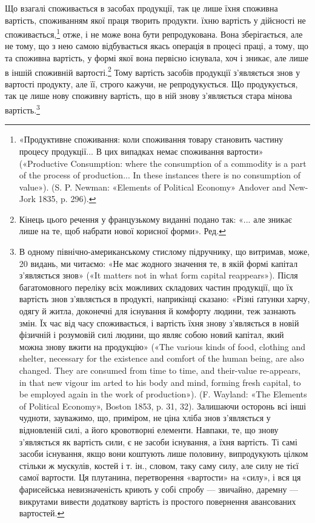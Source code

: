 Що взагалі споживається в засобах продукції, так це лише
їхня споживна вартість, споживанням якої праця творить продукти.
їхню вартість у дійсності не споживається,\footnote{
«Продуктивне споживання: коли споживання товару становить
частину процесу продукції... В цих випадках немає споживання вартости»
(«Productive Consumption: where the consumption of a commodity is a
part of the process of production... In these instances there is no consumption
of value»). (S. P. Newman: «Elements of Political Economy» Andover
and New-Jork 1835, p. 296).
} отже, і
не може вона бути репродукована. Вона зберігається, але не
тому, що з нею самою відбувається якась операція в процесі
праці, а тому, що та споживна вартість, у формі якої вона первісно
існувала, хоч і зникає, але лише в іншій споживній вартості.\footnote*{
Кінець цього речення у французькому виданні подано так: «... але
зникає лише на те, щоб набрати нової корисної форми». Ред.
}
Тому вартість засобів продукції з’являється знов у вартості
продукту, але її, строго кажучи, не репродукується. Що продукується,
так це лише нову споживну вартість, що в ній знову
з’являється стара мінова вартість.\footnote{
В одному північно-американському стислому підручнику, що витримав,
може, 20 видань, ми читаємо: «Не має жодного значення те, в
якій формі капітал з’являється знов» («It matters not in what form capital
reappears»). Після багатомовного переліку всіх можливих складових
частин продукції, що їх вартість знов з’являється в продукті, наприкінці
сказано: «Різні ґатунки харчу, одягу й житла, доконечні для існування
й комфорту людини, теж зазнають змін. Їх час від часу споживається, і
вартість їхня знову з’являється в новій фізичній і розумовій силі людини, що
являє собою новий капітал, який можна знову вжити на продукцію» («The
various kinds of food, clothing and shelter, necessary for the existence and
comfort of the human being, are also changed. They are consumed from time
to time, and their-value re-appears, in that new vigour im arted to his
body and mind, forming fresh capital, to be employed again in the work
of production»). (F. Wayland: «The Elements of Political Economy»,
Boston 1853, p. 31, 32). Залишаючи осторонь всі інші чудноти, зауважимо,
що, приміром, не ціна хліба знов з’являється у відновленій силі,
а його кровотворні елементи. Навпаки, те, що знову з’являється як вартість
сили, є не засоби існування, а їхня вартість. Ті самі засоби існування,
якщо вони коштують лише половину, випродукують цілком стільки ж
мускулів, костей і т. ін., словом, таку саму силу, але силу не тієї самої
вартости. Ця плутанина, перетворення «вартости» на «силу», і вся ця
фарисейська невизначеність криють у собі спробу — звичайно, даремну —
викрутами вивести додаткову вартість із простого повернення авансованих
вартостей.
}

